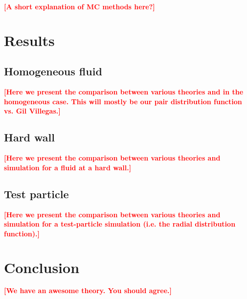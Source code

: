 \documentclass[letterpaper,twocolumn,amsmath,amssymb,pre,aps,10pt]{revtex4-1}
\newcommand\fixme[1]{\textcolor{red}{\textbf{[#1]}}}
\begin{document}
\fixme{A short explanation of MC methods here?}



\section{Results}

\subsection{Homogeneous fluid}

\fixme{Here we present the comparison between various theories and in
  the homogeneous case.  This will mostly be our pair distribution
  function vs. Gil Villegas.}

\subsection{Hard wall}

\fixme{Here we present the comparison between various theories and
  simulation for a fluid at a hard wall.}

\subsection{Test particle}

\fixme{Here we present the comparison between various theories and
  simulation for a test-particle simulation (i.e. the radial
  distribution function).}

\section{Conclusion}

\fixme{We have an awesome theory. You should agree.}

\end{document}

